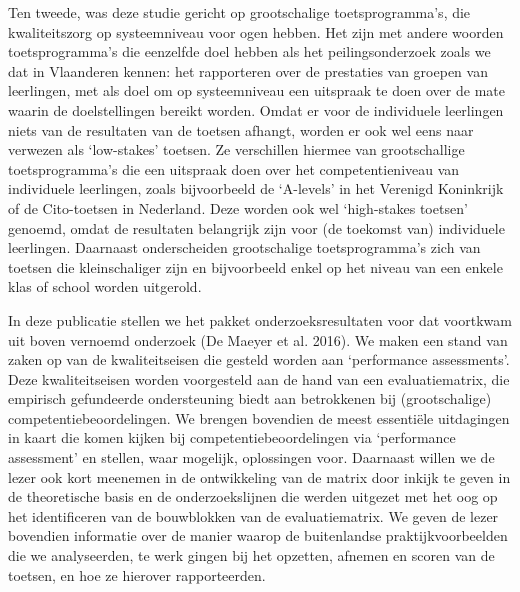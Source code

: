 \documentclass[
  letterpaper,
]{report}
\begin{document}
Ten tweede, was deze studie gericht op grootschalige toetsprogramma's,
die kwaliteitszorg op systeemniveau voor ogen hebben. Het zijn met
andere woorden toetsprogramma's die eenzelfde doel hebben als het
peilingsonderzoek zoals we dat in Vlaanderen kennen: het rapporteren
over de prestaties van groepen van leerlingen, met als doel om op
systeemniveau een uitspraak te doen over de mate waarin de
doelstellingen bereikt worden. Omdat er voor de individuele leerlingen
niets van de resultaten van de toetsen afhangt, worden er ook wel eens
naar verwezen als `low-stakes' toetsen. Ze verschillen hiermee van
grootschallige toetsprogramma's die een uitspraak doen over het
competentieniveau van individuele leerlingen, zoals bijvoorbeeld de
`A-levels' in het Verenigd Koninkrijk of de Cito-toetsen in Nederland.
Deze worden ook wel `high-stakes toetsen' genoemd, omdat de resultaten
belangrijk zijn voor (de toekomst van) individuele leerlingen. Daarnaast
onderscheiden grootschalige toetsprogramma's zich van toetsen die
kleinschaliger zijn en bijvoorbeeld enkel op het niveau van een enkele
klas of school worden uitgerold.

In deze publicatie stellen we het pakket onderzoeksresultaten voor dat
voortkwam uit boven vernoemd onderzoek (De Maeyer et al. 2016). We maken
een stand van zaken op van de kwaliteitseisen die gesteld worden aan
`performance assessments'. Deze kwaliteitseisen worden voorgesteld aan
de hand van een evaluatiematrix, die empirisch gefundeerde ondersteuning
biedt aan betrokkenen bij (grootschalige) competentiebeoordelingen. We
brengen bovendien de meest essentiële uitdagingen in kaart die komen
kijken bij competentiebeoordelingen via `performance assessment' en
stellen, waar mogelijk, oplossingen voor. Daarnaast willen we de lezer
ook kort meenemen in de ontwikkeling van de matrix door inkijk te geven
in de theoretische basis en de onderzoekslijnen die werden uitgezet met
het oog op het identificeren van de bouwblokken van de evaluatiematrix.
We geven de lezer bovendien informatie over de manier waarop de
buitenlandse praktijkvoorbeelden die we analyseerden, te werk gingen bij
het opzetten, afnemen en scoren van de toetsen, en hoe ze hierover
rapporteerden.
\end{document}
